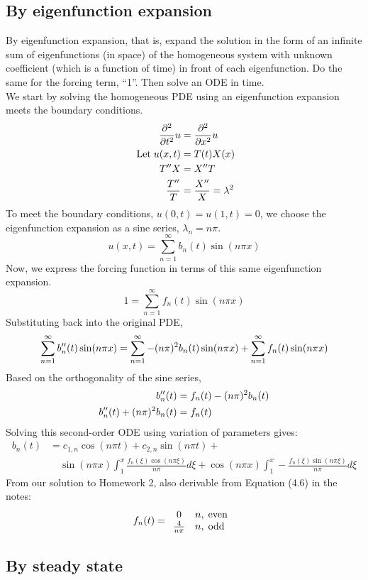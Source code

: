 \documentclass[12pt]{article}
\begin{document}
\subsection{By eigenfunction expansion}

By eigenfunction expansion, that is, expand the solution in the form of an infinite sum of eigenfunctions (in space) of the homogeneous system with unknown coefficient (which is a
function of time) in front of each eigenfunction. Do the same for the forcing term, ``1''. Then solve an ODE in time.
\[ \]
We start by solving the homogeneous PDE using an eigenfunction expansion meets the boundary conditions.
\begin{align*}
\frac{\partial^2}{\partial t^2}u &= \frac{\partial^2}{\partial x^2}u \\
\; \mathrm{Let} \; u(x,t) &= T(t)X(x) \\
T^{\prime\prime} X &= X^{\prime\prime} T \\
\frac{T^{\prime\prime}}{T} &= \frac{X^{\prime\prime}}{X} = \lambda^2
\end{align*}
To meet the boundary conditions, $u(0,t) = u(1,t) = 0$, we choose the eigenfunction expansion as a sine series, $\lambda_n = n\pi$.
\[ u(x,t) = \sum_{n=1}^\infty b_n(t)\sin(n\pi x) \]
Now, we express the forcing function in terms of this same eigenfunction expansion.
\[ 1 = \sum_{n=1}^\infty f_n(t)\sin(n\pi x) \]
Substituting back into the original PDE,
\[ \sum_{n=1}^\infty b_n^{\prime\prime}(t)\sin(n\pi x) = \sum_{n=1}^\infty -(n\pi)^2b_n(t) \sin(n\pi x) + \sum_{n=1}^\infty f_n(t)\sin(n\pi x) \]
Based on the orthogonality of the sine series,
\begin{align*}
b_n^{\prime\prime}(t) &= f_n(t) - (n\pi)^2b_n(t) \\
b_n^{\prime\prime}(t) + (n\pi)^2b_n(t) &= f_n(t)
\end{align*}
Solving this second-order ODE using variation of parameters gives:
\begin{align*} b_n(t) &= c_{1,n}\cos(n\pi t) + c_{2,n}\sin(n\pi t) + \\
&\quad \sin(n\pi x)\int_1^x\frac{f_n(\xi)\cos(n\pi\xi)}{n\pi}d\xi + \cos(n\pi x)\int_1^x -\frac{f_n(\xi)\sin(n\pi\xi)}{n\pi}d\xi
\end{align*}
From our solution to Homework 2, also derivable from Equation (4.6) in the notes:
\[
f_n(t) = \begin{array}{cl}
0 & n,\; \mathrm{even} \; \\
\frac{4}{n\pi} & n,\; \mathrm{odd} \;
\end{array}
\]

\newpage
\subsection{By steady state}
\end{document}
